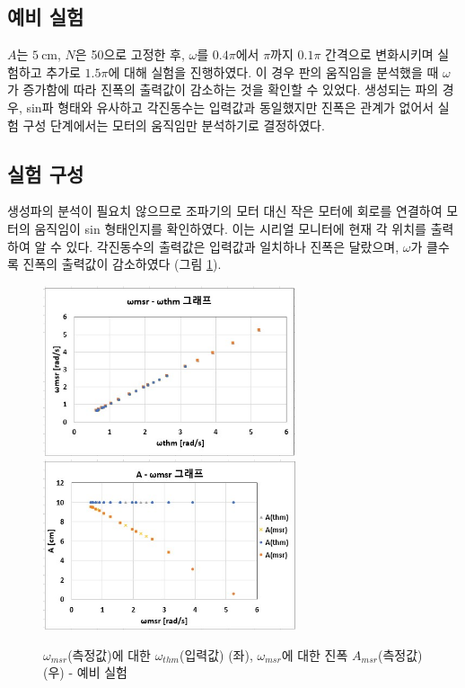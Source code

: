 \subsection{예비 실험}
$A$는 $5\mathrm{~cm}$, $N$은 50으로 고정한 후, $\omega$를 $0.4\pi$에서 $\pi$까지 $0.1\pi$ 간격으로 변화시키며 실험하고 추가로 $1.5\pi$에 대해 실험을 진행하였다. 
이 경우 판의 움직임을 분석했을 때 $\omega$가 증가함에 따라 진폭의 출력값이 감소하는 것을 확인할 수 있었다. 생성되는 파의 경우, sin파 형태와 유사하고 각진동수는 입력값과 동일했지만 진폭은 관계가 없어서 실험 구성 단계에서는 모터의 움직임만 분석하기로 결정하였다. 

\subsection{실험 구성}
생성파의 분석이 필요치 않으므로 조파기의 모터 대신 작은 모터에 회로를 연결하여 모터의 움직임이 sin 형태인지를 확인하였다. 이는 시리얼 모니터에 현재 각 위치를 출력하여 알 수 있다. 각진동수의 출력값은 입력값과 일치하나 진폭은 달랐으며, $\omega$가 클수록 진폭의 출력값이 감소하였다 (그림 \ref{PreExperiment}).

\begin{figure}[H]
    \centering
    \includegraphics[height=5cm]{images/PreExperiment_Graph(Omega-Omega)-junlam.jpg}
    \includegraphics[height=5cm]{images/PreExperiment_Graph(A-Omega)-junlam.jpg}
    \caption{$\omega_{msr}$(측정값)에 대한 $\omega_{thm}$(입력값) (좌),  $\omega_{msr}$에 대한 진폭 $A_{msr}$(측정값) (우) - 예비 실험}
    \label{PreExperiment}
\end{figure}

